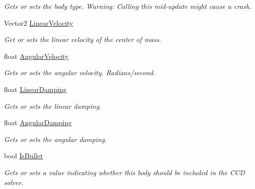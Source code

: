 \begin{DoxyCompactItemize}
\begin{DoxyCompactList}\small\item\em Gets or sets the body type. Warning\+: Calling this mid-\/update might cause a crash. \end{DoxyCompactList}\item 
Vector2 \hyperlink{class_farseer_physics_1_1_dynamics_1_1_body_ae0e95db409732f0aeac69a32495226b7}{Linear\+Velocity}
\begin{DoxyCompactList}\small\item\em Get or sets the linear velocity of the center of mass. \end{DoxyCompactList}\item 
float \hyperlink{class_farseer_physics_1_1_dynamics_1_1_body_a140f114a8b8bc2fdffa415b6aa7b9427}{Angular\+Velocity}
\begin{DoxyCompactList}\small\item\em Gets or sets the angular velocity. Radians/second. \end{DoxyCompactList}\item 
float \hyperlink{class_farseer_physics_1_1_dynamics_1_1_body_a32e1145d78bc3052db01ed242e35f300}{Linear\+Damping}
\begin{DoxyCompactList}\small\item\em Gets or sets the linear damping. \end{DoxyCompactList}\item 
float \hyperlink{class_farseer_physics_1_1_dynamics_1_1_body_a1c0b5c20a655be9ffeccf19eea6def1c}{Angular\+Damping}
\begin{DoxyCompactList}\small\item\em Gets or sets the angular damping. \end{DoxyCompactList}\item 
bool \hyperlink{class_farseer_physics_1_1_dynamics_1_1_body_a53ec3ed5fe9217ed48db503176d56bba}{Is\+Bullet}
\begin{DoxyCompactList}\small\item\em Gets or sets a value indicating whether this body should be included in the C\+C\+D solver. \end{DoxyCompactList}\item 

\end{DoxyCompactItemize}
